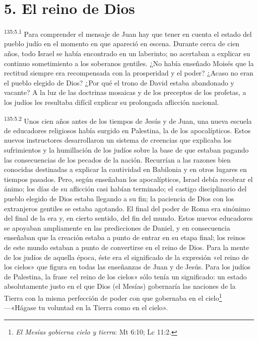\section*{5. El reino de Dios}
\par 
\textsuperscript{135:5.1} Para comprender el mensaje de Juan hay que tener en cuenta el estado del pueblo judío en el momento en que apareció en escena. Durante cerca de cien años, todo Israel se había encontrado en un laberinto; no acertaban a explicar su continuo sometimiento a los soberanos gentiles. ¿No había enseñado Moisés que la rectitud siempre era recompensada con la prosperidad y el poder? ¿Acaso no eran el pueblo elegido de Dios? ¿Por qué el trono de David estaba abandonado y vacante? A la luz de las doctrinas mosaicas y de los preceptos de los profetas, a los judíos les resultaba difícil explicar su prolongada aflicción nacional.

\par 
\textsuperscript{135:5.2} Unos cien años antes de los tiempos de Jesús y de Juan, una nueva escuela de educadores religiosos había surgido en Palestina, la de los apocalípticos. Estos nuevos instructores desarrollaron un sistema de creencias que explicaba los sufrimientos y la humillación de los judíos sobre la base de que estaban pagando las consecuencias de los pecados de la nación. Recurrían a las razones bien conocidas destinadas a explicar la cautividad en Babilonia y en otros lugares en tiempos pasados. Pero, según enseñaban los apocalípticos, Israel debía recobrar el ánimo; los días de su aflicción casi habían terminado; el castigo disciplinario del pueblo elegido de Dios estaba llegando a su fin; la paciencia de Dios con los extranjeros gentiles se estaba agotando. El final del poder de Roma era sinónimo del final de la era y, en cierto sentido, del fin del mundo. Estos nuevos educadores se apoyaban ampliamente en las predicciones de Daniel, y en consecuencia enseñaban que la creación estaba a punto de entrar en su etapa final; los reinos de este mundo estaban a punto de convertirse en el reino de Dios. Para la mente de los judíos de aquella época, éste era el significado de la expresión «el reino de los cielos» que figura en todas las enseñanzas de Juan y de Jesús. Para los judíos de Palestina, la frase «el reino de los cielos» sólo tenía un significado: un estado absolutamente justo en el que Dios (el Mesías) gobernaría las naciones de la Tierra con la misma perfección de poder con que gobernaba en el cielo\footnote{\textit{El Mesías gobierna cielo y tierra}: Mt 6:10; Lc 11:2.} ---«Hágase tu voluntad en la Tierra como en el cielo».


